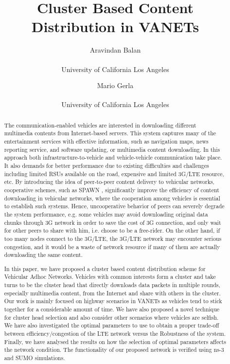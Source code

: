 \documentclass{acm_proc_article-sp}
\begin{document}
\title{Cluster Based Content Distribution in VANETs}


\author {
\alignauthor
Aravindan Balan\\
\\
University of California Los Angeles\\
       \and    
\alignauthor 
Mario Gerla\\
\\
University of California Los Angeles\\
}


\maketitle
\begin{abstract}
\vspace{1 mm}
The communication-enabled vehicles are interested in downloading different multimedia contents
from Internet-based servers. This system captures many of the entertainment services with
effective information, such as navigation maps, news reporting service, and software updating, or multimedia content downloading. In this approach both infrastructure-to-vehicle and vehicle-vehicle communication take place. It also demands for better performance due to existing difficulties and challenges including limited RSUs available on the road, expensive and limited 3G/LTE resource, etc. By introducing the idea of peer-to-peer content delivery to vehicular networks, cooperative schemes, such as SPAWN \cite{spawn}, significantly improve the efficiency of content downloading in vehicular networks, where the cooperation among vehicles is essential to establish such systems. Hence, uncooperative behavior of peers can severely degrade the system performance, e.g. some vehicles may avoid downloading original data chunks through 3G network in order to save the cost of 3G connection, and only wait for other peers to share with him, i.e. choose to be a free-rider. On the other hand, if too many nodes connect to the 3G/LTE, the 3G/LTE network may encounter serious congestion, and it would be a waste of network resource if many of them are actually downloading the same content.

In this paper, we have proposed a cluster based content distribution scheme for Vehicular Adhoc Networks. Vehicles with common interests form a cluster and take turns to be the cluster head that directly downloads data packets in multiple rounds, especially multimedia content, from the Internet and share with others in the cluster. Our work is mainly focused on highway scenarios in VANETs as vehicles tend to stick together for a considerable amount of time. We have also proposed a novel technique for cluster head selection and also consider other scenarios where vehicles are selfish. We have also investigated the optimal parameters to use to obtain a proper trade-off between efficiency/congestion of the LTE network versus the Robustness of the system. Finally, we have analysed the results on how the selection of optimal parameters affects the network condition. The functionality of our proposed network is verified using ns-3 and SUMO simulations. 


\end{abstract}
\end{document}
